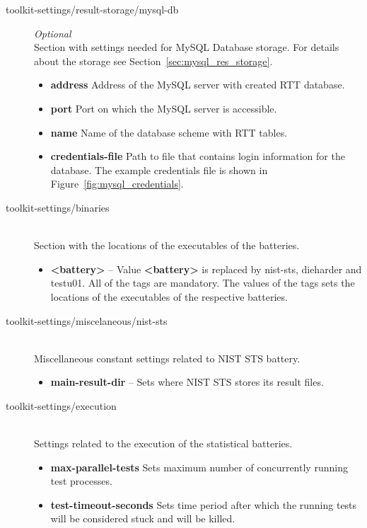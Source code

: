 \documentclass[
  digital,  	%
  color,		%
  oneside,   	%
  12pt,
  nocover,
  notable,
  nolof,
  nolot,
]{fithesis3}
\begin{document}
\begin{description}
\item[toolkit-settings/result-storage/mysql-db] \textit{Optional} \hfill \\
Section with settings needed for MySQL Database storage. For details about the storage see Section~\ref{sec:mysql_res_storage}.
\begin{itemize}
\item \textbf{address} Address of the MySQL server with created RTT database.
\item \textbf{port} Port on which the MySQL server is accessible.
\item \textbf{name} Name of the database scheme with RTT tables.
\item \textbf{credentials-file} Path to file that contains login information for the database. The example credentials file is shown in Figure~\ref{fig:mysql_credentials}.
\end{itemize}

\item[toolkit-settings/binaries] \hfill \\
Section with the locations of the executables of the batteries.
\begin{itemize}
\item \textbf{<battery>} -- Value \textbf{<battery>} is replaced by nist-sts, dieharder and testu01. All of the tags are mandatory. The values of the tags sets the locations of the executables of the respective batteries.
\end{itemize}

\item[toolkit-settings/miscelaneous/nist-sts] \hfill \\
Miscellaneous constant settings related to NIST STS battery.
\begin{itemize}
\item \textbf{main-result-dir} -- Sets where NIST STS stores its result files.
\end{itemize}

\item[toolkit-settings/execution] \hfill \\
Settings related to the execution of the statistical batteries.
\begin{itemize}
\item \textbf{max-parallel-tests} Sets maximum number of concurrently running test processes.
\item \textbf{test-timeout-seconds} Sets time period after which the running tests will be considered stuck and will be killed.
\end{itemize}
\end{description}
\end{document}
